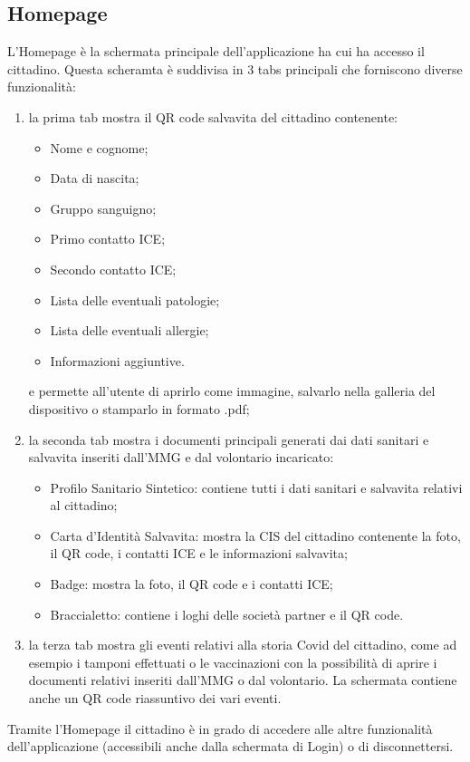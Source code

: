 \documentclass[12pt,a4paper,twoside,openright,titlepage]{book}
\begin{document}
\subsection{Homepage}
L'Homepage è la schermata principale dell'applicazione ha cui ha accesso il cittadino. Questa scheramta è suddivisa in 3 tabs principali che forniscono diverse funzionalità:
\begin{enumerate}
\item la prima tab mostra il QR code salvavita del cittadino contenente:
\begin{itemize}
\item Nome e cognome;
\item Data di nascita;
\item Gruppo sanguigno;
\item Primo contatto ICE;
\item Secondo contatto ICE;
\item Lista delle eventuali patologie;
\item Lista delle eventuali allergie;
\item Informazioni aggiuntive.
\end{itemize}
e permette all'utente di aprirlo come immagine, salvarlo nella galleria del dispositivo o stamparlo in formato .pdf;
\item la seconda tab mostra i documenti principali generati dai dati sanitari e salvavita inseriti dall'MMG e dal volontario incaricato:
\begin{itemize}
\item Profilo Sanitario Sintetico: contiene tutti i dati sanitari e salvavita relativi al cittadino;
\item Carta d'Identità Salvavita: mostra la CIS del cittadino contenente la foto, il QR code, i contatti ICE e le informazioni salvavita;
\item Badge: mostra la foto, il QR code e i contatti ICE;
\item Braccialetto: contiene i loghi delle società partner e il QR code.
\end{itemize}
\item la terza tab mostra gli eventi relativi alla storia Covid del cittadino, come ad esempio i tamponi effettuati o le vaccinazioni con la possibilità di aprire i documenti relativi inseriti dall'MMG o dal volontario. La schermata contiene anche un QR code riassuntivo dei vari eventi.
\end{enumerate}
Tramite l'Homepage il cittadino è in grado di accedere alle altre funzionalità dell'applicazione (accessibili anche dalla schermata di Login) o di disconnettersi.
\end{document}
